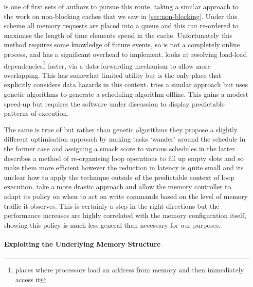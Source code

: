 \citet{kiniwaLookaheadSchedulingRequests1998} is one of first sets of authors to pursue this route, taking a similar approach to the work on non-blocking caches that we saw in \ref{sec:non-blocking}. Under this scheme all memory requests are placed into a queue and this can re-ordered to maximise the length of time elements spend in the cache. Unfortunately this method requires some knowledge of future events, so is not a completely online process, and has a significant overhead to implement. \citet{yangOverlappingDependentLoads2006} looks at resolving load-load dependencies\footnote{places where processors load an address from memory and then immediately access it} faster, via a data forwarding mechanism to allow more overlapping. This has somewhat limited utility but is the only place that explicitly considers data hazards in this context. \citet{luoDesignRealizationOptimized2010} tries a similar approach but uses genetic algorithms to generate a scheduling algorithm offline. This gains a modest speed-up but requires the software under discussion to display predictable patterns of execution. 

The same is true of \citet{wei-chetsengOptimalSchedulingMinimize2010, kegleyPredictiveCacheModeling2011} but rather than genetic algorithms they propose a slightly different optimisation approach by making tasks `wander' around the schedule in the former case and assigning a \gls{smack} score to various schedules in the latter. \citet{qaziOptimizationAccessLatency2016} describes a method of re-organising loop operations to fill up empty slots and so make them more efficient however the reduction in latency is quite small and its unclear how to apply the technique outside of the predictable context of loop execution. \citet{modgilImprovingPerformanceChip2018} take a more drastic approach and allow the memory controller to adapt its policy on when to act on write commands based on the level of memory traffic it observes. This is certainly a step in the right directions but the performance increases are highly correlated with the memory configuration itself, showing this policy is much less general than necessary for our purposes.

\paragraph{Exploiting the Underlying Memory Structure}

